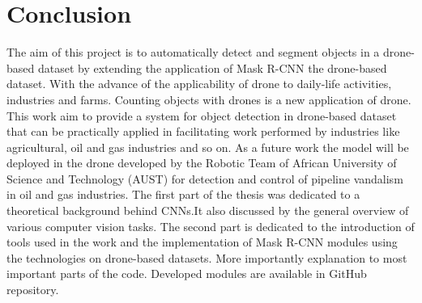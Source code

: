 \chapter{Conclusion}\label{ch:PRACTICE}

\begin{summary}
The aim of this project is to automatically detect and segment objects in a drone-based dataset by extending the application of Mask R-CNN the drone-based dataset. With the advance of the applicability of drone to daily-life activities, industries and farms. Counting objects with drones is a new application of drone. This work aim to provide a system for object detection in drone-based dataset that can be practically applied in facilitating work performed by industries like agricultural, oil and gas industries and so on.  As a future work the model will be deployed in the drone developed by the Robotic Team of African University of Science and Technology (AUST) for detection and control of pipeline vandalism in oil and gas industries. 
The first part of the thesis was dedicated to a theoretical background behind
CNNs.It also discussed by the general overview of various computer vision tasks. The second part is dedicated to the introduction of tools used in the work and the implementation of Mask R-CNN modules using the technologies on drone-based datasets. More importantly explanation to most important parts of the code.
Developed modules are available in GitHub repository.  


\end{summary}




